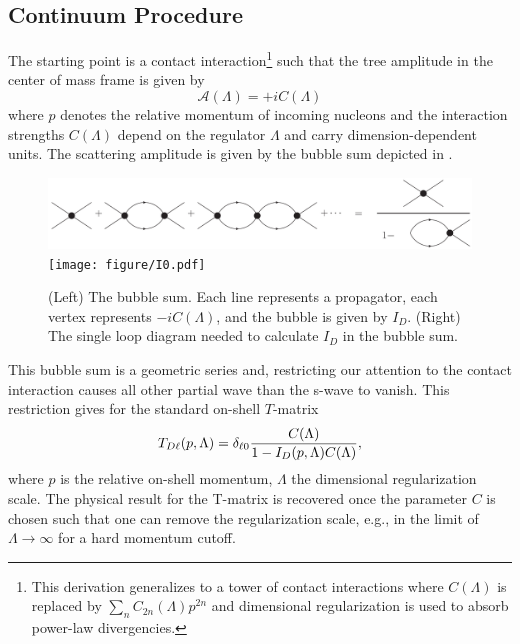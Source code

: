 \subsection{Continuum Procedure}\label{sec:continuum}
The starting point is a contact interaction\footnote{This derivation generalizes to a tower of contact interactions where $C(\Lambda)$ is replaced by $\sum_n C_{2n}(\Lambda) p^{2n}$ \cite{Kaplan:1998we,Beane:2003da} and dimensional regularization is used to absorb power-law divergencies.} such that the tree amplitude in the center of mass frame is given by
\begin{equation}
    \mathcal A(\Lambda) = + i C(\Lambda)
\end{equation}
where $p$ denotes the relative momentum of incoming nucleons and the interaction strengths $ C(\Lambda)$ depend on the regulator $\Lambda$ and carry dimension-dependent units.
The scattering amplitude is given by the bubble sum depicted in .

\begin{figure}[ht!]
\center
\includegraphics[width=.675\columnwidth]{figure/bubbleSum.pdf}
\hfill
\texttt{[image: figure/I0.pdf]}
\caption{(Left) The bubble sum. Each line represents a propagator, each vertex represents $-i C(\Lambda)$, and the bubble is given by $I_D$.
(Right) The single loop diagram needed to calculate $I_D$ in the bubble sum.
\label{fig:bubbleSum}}
\end{figure}

This bubble sum is a geometric series and, restricting our attention to the contact interaction causes all other partial wave than the s-wave to vanish.
This restriction gives for the standard on-shell $T$-matrix
\begin{equation}\label{eq:T matrix}
T_{D\ell}(p, \Lambda) = \delta_{\ell 0} \frac{C(\Lambda)}{1-I_D(p,\Lambda) C(\Lambda)},
\end{equation}
where $p$ is the relative on-shell momentum, $\Lambda$ the dimensional regularization scale.
The physical result for the T-matrix is recovered once the parameter $C$ is chosen such that one can remove the regularization scale, e.g., in the limit of $\Lambda \to \infty$ for a hard momentum cutoff.

